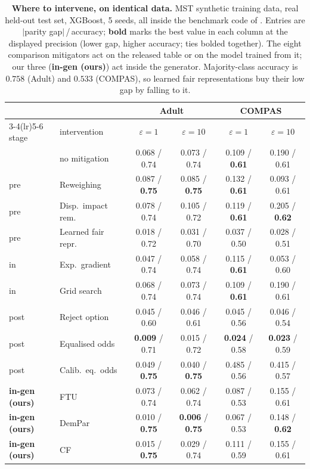 \begin{table}[t]
\centering\footnotesize
\caption{\textbf{Where to intervene, on identical data.} MST synthetic
training data, real held-out test set, XGBoost, 5 seeds, all inside the
benchmark code of \citet{angelozzi2026where}. Entries are $|$parity
gap$|$\,/\,accuracy; \textbf{bold} marks the best value in each column at
the displayed precision (lower gap, higher accuracy; ties bolded together).
The eight comparison mitigators act on the released table or on the model
trained from it; our three (\textbf{in-gen (ours)}) act inside the
generator. Majority-class accuracy is $0.758$ (Adult) and $0.533$ (COMPAS),
so learned fair representations buy their low gap by falling to it. }
\label{tab:baselines}
\begin{tabular}{llcccc}
\toprule
 & & \multicolumn{2}{c}{Adult} & \multicolumn{2}{c}{COMPAS} \\
\cmidrule(lr){3-4}\cmidrule(lr){5-6}
stage & intervention & $\varepsilon{=}1$ & $\varepsilon{=}10$ & $\varepsilon{=}1$ & $\varepsilon{=}10$ \\
\midrule
 & no mitigation        & 0.068 / 0.74 & 0.073 / 0.74 & 0.109 / \textbf{0.61} & 0.190 / 0.61 \\
\addlinespace[2pt]
pre  & Reweighing         & 0.087 / \textbf{0.75} & 0.085 / \textbf{0.75} & 0.132 / \textbf{0.61} & 0.093 / 0.61 \\
pre  & Disp.\ impact rem. & 0.078 / 0.74 & 0.105 / 0.72 & 0.119 / \textbf{0.61} & 0.205 / \textbf{0.62} \\
pre  & Learned fair repr. & 0.018 / 0.72 & 0.031 / 0.70 & 0.037 / 0.50 & 0.028 / 0.51 \\
\addlinespace[2pt]
in   & Exp.\ gradient     & 0.047 / 0.74 & 0.058 / 0.74 & 0.115 / \textbf{0.61} & 0.053 / 0.60 \\
in   & Grid search        & 0.068 / 0.74 & 0.073 / 0.74 & 0.109 / \textbf{0.61} & 0.190 / 0.61 \\
\addlinespace[2pt]
post & Reject option      & 0.045 / 0.60 & 0.046 / 0.61 & 0.045 / 0.56 & 0.046 / 0.54 \\
post & Equalised odds     & \textbf{0.009} / 0.71 & 0.015 / 0.72 & \textbf{0.024} / 0.58 & \textbf{0.023} / 0.59 \\
post & Calib.\ eq.\ odds  & 0.049 / \textbf{0.75} & 0.040 / \textbf{0.75} & 0.485 / 0.56 & 0.415 / 0.57 \\
\addlinespace[2pt]
\textbf{in-gen (ours)} & FTU    & 0.073 / 0.74 & 0.062 / 0.74 & 0.087 / 0.53 & 0.155 / 0.61 \\
\textbf{in-gen (ours)} & DemPar & 0.010 / \textbf{0.75} & \textbf{0.006} / \textbf{0.75} & 0.067 / 0.53 & 0.148 / \textbf{0.62} \\
\textbf{in-gen (ours)} & CF     & 0.015 / \textbf{0.75} & 0.029 / 0.74 & 0.111 / 0.59 & 0.155 / 0.61 \\
\bottomrule
\end{tabular}
\end{table}
